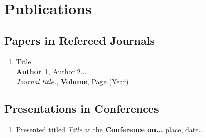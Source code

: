 \documentclass[MTech,synopsis]{iitmdiss}
\begin{document}
\section{Publications}
\subsection{Papers in Refereed Journals}
\begin{enumerate}
\item Title \\
	{\bf Author 1}, Author 2...\\
	{\it Journal title.}, {\bf Volume}, Page (Year)
\end{enumerate}

\subsection{Presentations in Conferences}
\begin{enumerate}
\item  Presented titled  {\em Title} at the {\bf Conference on...}  place, date..
\end{enumerate}
\end{document}
